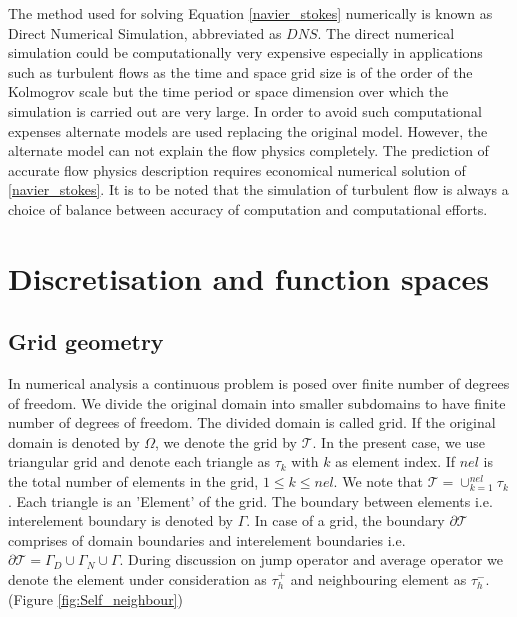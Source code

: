 \documentclass[a4paper,openany]{book}
\begin{document}
The method used for solving Equation \eqref{navier_stokes} numerically is known as Direct Numerical Simulation, abbreviated as $DNS$. The direct numerical simulation could be computationally very expensive especially in applications such as turbulent flows as the time and space grid size is of the order of the Kolmogrov scale but the time period or space dimension over which the simulation is carried out are very large. In order to avoid such computational expenses alternate models are used replacing the original model. However, the alternate model can not explain the flow physics completely. The prediction of accurate flow physics description requires economical numerical solution of \eqref{navier_stokes}. It is to be noted that the simulation of turbulent flow is always a choice of balance between accuracy of computation and computational efforts.

\chapter{Discretisation and function spaces}

\section{Grid geometry}

In numerical analysis a continuous problem is posed over finite number of degrees of freedom. We divide the original domain into smaller subdomains to have finite number of degrees of freedom. The divided domain is called grid. If the original domain is denoted by $\Omega$, we denote the grid by $\mathcal{T}$. In the present case, we use triangular grid and denote each triangle as $\tau_k$ with $k$ as element index. If $nel$ is the total number of elements in the grid, $1\leq k \leq nel$. We note that $\mathcal{T} = \cup_{k=1}^{nel} \tau_k$. Each triangle is an 'Element' of the grid. The boundary between elements i.e. interelement boundary is denoted by $\Gamma$. In case of a grid, the boundary $\partial \mathcal{T}$ comprises of domain boundaries and interelement boundaries i.e. $\partial \mathcal{T} = \Gamma_D \cup \Gamma_N \cup \Gamma$. During discussion on jump operator and average operator we denote the element under consideration as $\tau_{h}^+$ and neighbouring element as $\tau_{h}^-$. (Figure \ref{fig:Self_neighbour})
\end{document}
